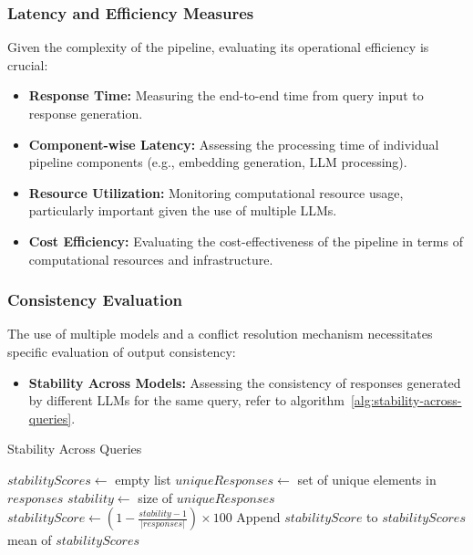 \subsubsection{Latency and Efficiency Measures}
Given the complexity of the pipeline, evaluating its operational efficiency is crucial:
\begin{itemize}
    \item \textbf{Response Time:} Measuring the end-to-end time from query input to response generation.
    \item \textbf{Component-wise Latency:} Assessing the processing time of individual pipeline components (e.g., embedding generation, LLM processing).
    \item \textbf{Resource Utilization:} Monitoring computational resource usage, particularly important given the use of multiple LLMs.
    \item \textbf{Cost Efficiency:} Evaluating the cost-effectiveness of the pipeline in terms of computational resources and infrastructure.
\end{itemize}
\subsubsection{Consistency Evaluation}
The use of multiple models and a conflict resolution mechanism necessitates specific evaluation of output consistency:

\begin{itemize}
    \item \textbf{Stability Across Models:} Assessing the consistency of responses generated by different LLMs for the same query, refer to algorithm~\ref{alg:stability-across-queries}.
\end{itemize}
\begin{algorithm}
    \caption{Stability Across Queries}
    \begin{algorithmic}[1]
            \State $stabilityScores \gets$ empty list
                \State $uniqueResponses \gets$ set of unique elements in $responses$
                \State $stability \gets$ size of $uniqueResponses$
                \State $stabilityScore \gets (1 - \frac{stability - 1}{|responses|}) \times 100$
                \State Append $stabilityScore$ to $stabilityScores$
                    \State \Return mean of $stabilityScores$
                \Else
                    \State {}
                \EndIf
            \EndFor
        \EndProcedure
    \end{algorithmic}\label{alg:stability-across-queries}
\end{algorithm}

